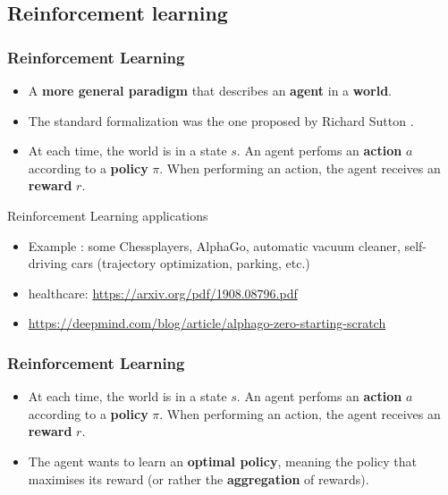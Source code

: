 \documentclass[usenames,dvipsnames]{beamer}
\begin{document}
\subsection{Reinforcement learning} %
\label{sub:reinforcement_learning}

\begin{frame}
\frametitle{Reinforcement Learning}
\begin{itemize}
	\item A \textbf{more general paradigm} that describes an \textbf{agent} in a \textbf{world}.
	\item The standard formalization was the one proposed by Richard Sutton \cite{Sutton1998}.
	\item At each time, the world is in a state $s$. An agent perfoms an \textbf{action} $a$ according to a \textbf{policy} $\pi$. When performing an action, the agent receives an \textbf{reward} $r$.
\end{itemize}
\end{frame}

\begin{frame}{Reinforcement Learning applications}
    \begin{itemize}
	\item	Example : some Chessplayers, AlphaGo, automatic vacuum cleaner,
        self-driving cars (trajectory optimization, parking, etc.)

    \item    healthcare: \url{https://arxiv.org/pdf/1908.08796.pdf} 
        \item \url{https://deepmind.com/blog/article/alphago-zero-starting-scratch} 

    \end{itemize}
    
\end{frame}

\begin{frame}
\frametitle{Reinforcement Learning}
\begin{itemize}
	\item At each time, the world is in a state $s$. An agent perfoms an \textbf{action} $a$ according to a \textbf{policy} $\pi$. When performing an action, the agent receives an \textbf{reward} $r$.
	\item The agent wants to learn an \textbf{optimal policy}, meaning the policy that maximises its reward (or rather the \textbf{aggregation} of rewards).
\end{itemize}
\end{frame}
\end{document}
